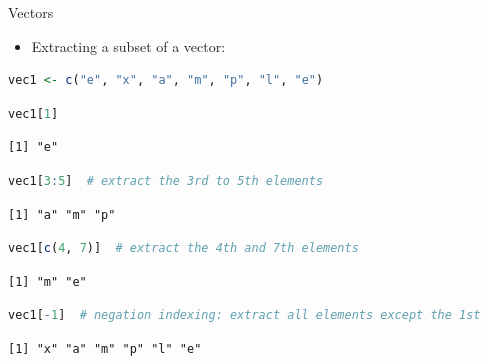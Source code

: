 \begin{frame}[fragile]{Vectors}
\begin{itemize}
  \item Extracting a subset of a vector:
\end{itemize}
\begin{lstlisting}[language=R]
vec1 <- c("e", "x", "a", "m", "p", "l", "e")
\end{lstlisting}
\begin{lstlisting}[language=R]
vec1[1]
\end{lstlisting}
\begin{lstlisting}[style=output]
[1] "e"
\end{lstlisting}
\begin{lstlisting}[language=R]
vec1[3:5]  # extract the 3rd to 5th elements
\end{lstlisting}
\begin{lstlisting}[style=output]
[1] "a" "m" "p"
\end{lstlisting}
\begin{lstlisting}[language=R]
vec1[c(4, 7)]  # extract the 4th and 7th elements
\end{lstlisting}
\begin{lstlisting}[style=output]
[1] "m" "e"
\end{lstlisting}
\begin{lstlisting}[language=R]
vec1[-1]  # negation indexing: extract all elements except the 1st
\end{lstlisting}
\begin{lstlisting}[style=output]
[1] "x" "a" "m" "p" "l" "e"
\end{lstlisting}
\end{frame}

